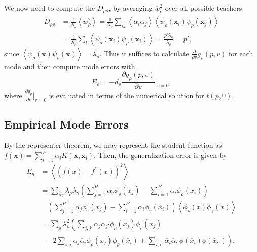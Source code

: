 \documentclass{article}
\begin{document}
We now need to compute the $D_{\rho\rho}$, by averaging $\overline{w}_\rho^2$ over all possible teachers 
\begin{align}\label{d_expt}
\nonumber
    D_{\rho\rho} &= \frac{1}{\lambda_\rho} \left< \overline{w}_\rho^2 \right> = \frac{1}{\lambda_\rho} \sum_{ij} \left< \alpha_i \alpha_j \right> \left< \psi_\rho(\mathbf{\overline{x}}_i) \psi_\rho(\mathbf{\overline{x}}_j) \right>
    \\
    &= \frac{1}{\lambda_\rho} \sum_i \left<\psi_\rho(\mathbf{\overline{x}}_i) \psi_\rho(\mathbf{\overline{x}}_i) \right> = \frac{p'\lambda_\rho}{\lambda_\rho} = p',
\end{align}
%
since $\left< \psi_\rho(\mathbf{x}) \psi_\rho(\mathbf{x}) \right> = \lambda_\rho$. Thus it suffices to calculate $\frac{\partial}{\partial v} g_\rho(p,v)$ for each mode and then compute mode errors with
\begin{equation}
    E_\rho = - d_\rho \frac{\partial g_\rho(p,v)}{\partial v}|_{v=0},
\end{equation}
%
where $\frac{\partial g_\rho}{\partial v}|_{v=0}$ is evaluated in terms of the numerical solution for $t(p,0)$.

\subsection{Empirical Mode Errors}\label{SIRegressionModeError}

By the representer theorem, we may represent the student function as $f(\mathbf{x}) = \sum_{i=1}^P \alpha_i K(\mathbf{x},\mathbf{x}_i)$. Then, the generalization error is given by
%
\begin{align}
    \nonumber
    E_g &= \left< ( f(x) - f^*(x) )^2 \right> 
    \\
    \nonumber
    &= \sum_{\rho \gamma}   \lambda_\rho \lambda_\gamma \left( \sum_{j=1}^P \alpha_j \phi_\rho(x_j) - \sum_{i=1}^{P'} \overline{\alpha}_i \phi_\rho(\overline{x}_i)  \right) 
    \\
    \nonumber
    &\quad\left( \sum_{j=1}^P \alpha_j \phi_\gamma(x_j) - \sum_{i=1}^{P'} \overline{\alpha}_i \phi_\gamma(\overline{x}_i) \right) 
    \left< \phi_\rho(x) \phi_\gamma(x) \right>
    \\
    \nonumber
    &= \sum_\rho \lambda_\rho^2 \left( \sum_{j,j'} \alpha_{j} \alpha_{j'} \phi_\rho(x_j) \phi_\rho(x_j) \right.
    \\
    &\quad\left.- 2 \sum_{i,j} \alpha_j \overline{\alpha}_i \phi_\rho(x_j) \phi_\rho(\overline{x}_i)
     + \sum_{i,i'} \overline{\alpha}_i \overline{\alpha}_{i'} \phi(\overline{x}_i) \phi(\overline{x}_{i'}) \right).
\end{align}
\end{document}
